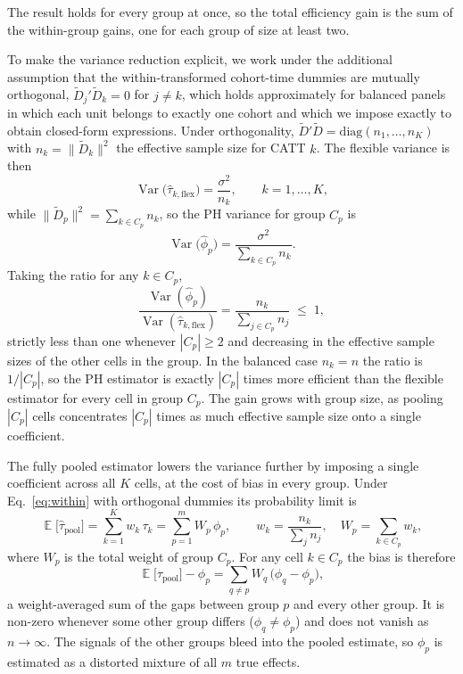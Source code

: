 \documentclass[margin=5in, 12pt]{article}
\DeclareMathOperator{\E}{\mathbb{E}}
\DeclareMathOperator{\Var}{Var}
\newcommand{\1}{\mathbbm{1}}
\newcommand{\Dtd}{\tilde{D}}
\begin{document}
\noindent The result holds for every group at once, so the total efficiency gain
is the sum of the within-group gains, one for each group of size at least two.

To make the variance reduction explicit, we work under the additional assumption
that the within-transformed cohort-time dummies are mutually orthogonal,
$\tilde{D}_j'\tilde{D}_k = 0$ for $j \neq k$, which holds approximately for
balanced panels in which each unit belongs to exactly one cohort and which we
impose exactly to obtain closed-form expressions. Under orthogonality,
$\Dtd'\Dtd = \mathrm{diag}(n_1,\ldots,n_K)$ with $n_k = \|\tilde{D}_k\|^2$ the
effective sample size for CATT $k$. The flexible variance is then
\begin{equation}
  \Var\!\bigl(\hat\tau_{k,\text{flex}}\bigr)
  = \frac{\sigma^2}{n_k},
  \qquad k = 1,\ldots,K,
  \label{eq:flex_var_orth}
\end{equation}
while $\|\tilde{D}_p\|^2 = \sum_{k\in C_p} n_k$, so the PH variance for group
$C_p$ is
\begin{equation}
  \Var\!\bigl(\hat\phi_{p}\bigr)
  = \frac{\sigma^2}{\displaystyle\sum_{k\in C_p} n_k}.
  \label{eq:oracle_var_orth}
\end{equation}
Taking the ratio for any $k \in C_p$,
\begin{equation}
  \frac{\Var(\hat\phi_{p})}{\Var(\hat\tau_{k,\text{flex}})}
  = \frac{n_k}{\displaystyle\sum_{j\in C_p} n_j}
  \;\leq\; 1,
  \label{eq:var_ratio}
\end{equation}
strictly less than one whenever $|C_p| \geq 2$ and decreasing in the effective
sample sizes of the other cells in the group. In the balanced case $n_k = n$ the
ratio is $1/|C_p|$, so the PH estimator is exactly $|C_p|$ times more efficient
than the flexible estimator for every cell in group $C_p$. The gain grows with
group size, as pooling $|C_p|$ cells concentrates $|C_p|$ times as much effective
sample size onto a single coefficient.

The fully pooled estimator lowers the variance further by imposing a single
coefficient across all $K$ cells, at the cost of bias in every group. Under
Eq.~\ref{eq:within} with orthogonal dummies its probability limit is
\begin{equation}
  \E\bigl[\hat\tau_{\text{pool}}\bigr]
  = \sum_{k=1}^K w_k\,\tau_k
  = \sum_{p=1}^m W_p\,\phi_p,
  \qquad
  w_k = \frac{n_k}{\sum_j n_j}, \quad W_p = \sum_{k\in C_p} w_k,
  \label{eq:pool_plim}
\end{equation}
where $W_p$ is the total weight of group $C_p$. For any cell $k \in C_p$ the bias
is therefore
\begin{equation}
  \E\bigl[\hat\tau_{\text{pool}}\bigr] - \phi_{p}
  = \sum_{q \neq p} W_q\,\bigl(\phi_q - \phi_p\bigr),
  \label{eq:pool_bias_hetero}
\end{equation}
a weight-averaged sum of the gaps between group $p$ and every other group. It is
non-zero whenever some other group differs ($\phi_q \neq \phi_p$) and does not
vanish as $n \to \infty$. The signals of the other groups bleed into the pooled
estimate, so $\phi_p$ is estimated as a distorted mixture of all $m$ true effects.
\end{document}
